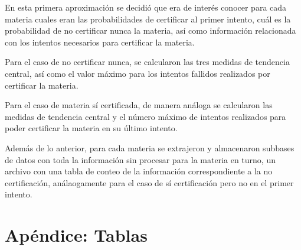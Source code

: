 \documentclass[12pt]{article}
\begin{document}
En esta primera aproximaci\'on se decidi\'o que era de inter\'es conocer para cada materia cuales eran las probabilidades de certificar al primer intento, cu\'al es la probabilidad de no certificar nunca la materia, as\'i como informaci\'on  relacionada con los intentos necesarios para certificar la materia.

Para el caso de no certificar nunca, se calcularon las tres medidas de tendencia central, as\'i como el valor m\'aximo para los intentos fallidos realizados por certificar la materia.



Para el caso de materia s\'i certificada, de manera an\'aloga se calcularon las medidas de tendencia central y el n\'umero m\'aximo de intentos realizados para poder certificar la materia en su \'ultimo intento. 

Adem\'as de lo anterior, para cada materia se extrajeron y almacenaron subbases de datos con toda la informaci\'on sin procesar para la materia en turno, un archivo con una tabla de conteo de la informaci\'on correspondiente a la no certificaci\'on, an\'alaogamente para el caso de s\'i certificaci\'on pero no en el primer intento. 


\section{Ap\'endice: Tablas}
\end{document}
